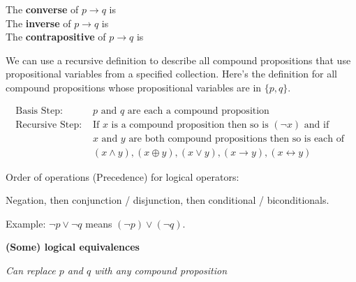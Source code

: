 \documentclass[12pt, oneside]{article}
\begin{document}
The {\bf converse}  of $p \to q$ is \underline{}\\

The {\bf inverse}  of $p \to q$ is \underline{}\\

The {\bf contrapositive}  of $p \to q$ is \underline{} \\
 \vfill


We can use a recursive definition to describe all 
compound propositions that use propositional variables 
from a specified collection.  Here's the definition
for all compound propositions whose propositional variables 
are in $\{p, q\}$.

\[
\begin{array}{ll}
\textrm{Basis Step: } & p \textrm{ and } q \textrm{ are each a compound proposition} \\
\textrm{Recursive Step: } & \textrm{If } x \textrm{ is a compound proposition then so is } (\lnot x) 
\textrm{ and if } \\
& x \textrm{ and } y \textrm{ are both compound propositions then so is each of }\\
&(x \land y), (x \oplus y), (x \lor y), (x \to y), (x \leftrightarrow y)
\end{array}
\] 

Order of operations (Precedence) for logical operators: 

Negation, then conjunction / disjunction, then conditional / biconditionals.

Example: $\lnot p \lor \lnot q$ means $(\lnot p) \lor (\lnot q)$.
 \newpage


{\bf (Some) logical equivalences}

{\it Can replace $p$ and $q$ with any compound proposition}
\end{document}
